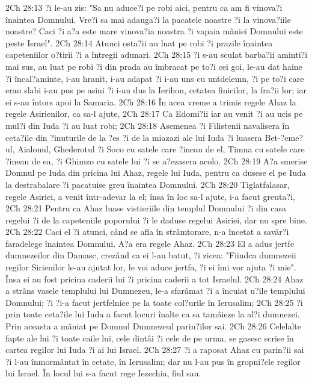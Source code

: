 2Ch 28:13  ?i le-au zis: "Sa nu aduce?i pe robi aici, pentru ca am fi vinova?i înaintea Domnului. Vre?i sa mai adauga?i la pacatele noastre ?i la vinova?iile noastre? Caci ?i a?a este mare vinova?ia noastra ?i vapaia mâniei Domnului este peste Israel".
2Ch 28:14  Atunci osta?ii au luat pe robi ?i prazile înaintea capeteniilor o?tirii ?i a întregii adunari.
2Ch 28:15  ?i s-au sculat barba?ii aminti?i mai sus, au luat pe robi ?i din prada au îmbracat pe to?i cei goi, le-au dat haine ?i încal?aminte, i-au hranit, i-au adapat ?i i-au uns cu untdelemn, ?i pe to?i care erau slabi i-au pus pe asini ?i i-au dus la Ierihon, cetatea finicilor, la fra?ii lor; iar ei s-au întors apoi la Samaria.
2Ch 28:16  În acea vreme a trimis regele Ahaz la regele Asirienilor, ca sa-l ajute,
2Ch 28:17  Ca Edomi?ii iar au venit ?i au ucis pe mul?i din Iuda ?i au luat robi;
2Ch 28:18  Asemenea ?i Filistenii navalisera în ceta?ile din ?inuturile de la ?es ?i de la miazazi ale lui Iuda ?i luasera Bet-?eme?ul, Aialonul, Ghederotul ?i Soco cu satele care ?ineau de el, Timna cu satele care ?ineau de ea, ?i Ghimzo cu satele lui ?i se a?ezasera acolo.
2Ch 28:19  A?a smerise Domnul pe Iuda din pricina lui Ahaz, regele lui Iuda, pentru ca dusese el pe Iuda la destrabalare ?i pacatuise greu înaintea Domnului.
2Ch 28:20  Tiglatfalasar, regele Asiriei, a venit într-adevar la el; însa în loc sa-l ajute, i-a facut greuta?i,
2Ch 28:21  Pentru ca Ahaz luase vistieriile din templul Domnului ?i din casa regelui ?i de la capeteniile poporului ?i le daduse regelui Asiriei, dar nu spre bine.
2Ch 28:22  Caci el ?i atunci, când se afla în strâmtorare, n-a încetat a savâr?i faradelege înaintea Domnului. A?a era regele Ahaz.
2Ch 28:23  El a adus jertfe dumnezeilor din Damasc, crezând ca ei l-au batut, ?i zicea: "Fiindca dumnezeii regilor Sirienilor le-au ajutat lor, le voi aduce jertfa, ?i ei îmi vor ajuta ?i mie". Însa ei au fost pricina caderii lui ?i pricina caderii a tot Israelul.
2Ch 28:24  Ahaz a strâns vasele templului lui Dumnezeu, le-a sfarâmat ?i a încuiat u?ile templului Domnului; ?i ?i-a facut jertfelnice pe la toate col?urile în Ierusalim;
2Ch 28:25  ?i prin toate ceta?ile lui Iuda a facut locuri înalte ca sa tamâieze la al?i dumnezei. Prin aceasta a mâniat pe Domnul Dumnezeul parin?ilor sai.
2Ch 28:26  Celelalte fapte ale lui ?i toate caile lui, cele dintâi ?i cele de pe urma, se gasesc scrise în cartea regilor lui Iuda ?i ai lui Israel.
2Ch 28:27  ?i a raposat Ahaz cu parin?ii sai ?i l-au înmormântat în cetate, în Ierusalim; dar nu l-au pus în gropni?ele regilor lui Israel. În locul lui s-a facut rege Iezechia, fiul sau.
